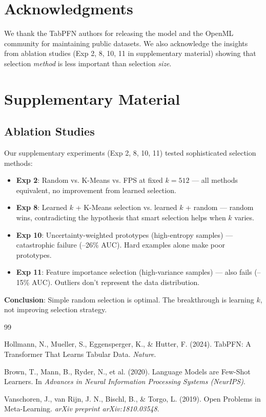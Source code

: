 \documentclass[11pt,a4paper]{article}
\begin{document}
\section*{Acknowledgments}

We thank the TabPFN authors for releasing the model and the OpenML community for maintaining public datasets. We also acknowledge the insights from ablation studies (Exp 2, 8, 10, 11 in supplementary material) showing that selection \textit{method} is less important than selection \textit{size}.

\section*{Supplementary Material}

\subsection*{Ablation Studies}

Our supplementary experiments (Exp 2, 8, 10, 11) tested sophisticated selection methods:

\begin{itemize}
\item \textbf{Exp 2}: Random vs. K-Means vs. FPS at fixed $k=512$ — all methods equivalent, no improvement from learned selection.
\item \textbf{Exp 8}: Learned $k$ + K-Means selection vs. learned $k$ + random — random wins, contradicting the hypothesis that smart selection helps when $k$ varies.
\item \textbf{Exp 10}: Uncertainty-weighted prototypes (high-entropy samples) — catastrophic failure (--26\% AUC). Hard examples alone make poor prototypes.
\item \textbf{Exp 11}: Feature importance selection (high-variance samples) — also fails (--15\% AUC). Outliers don't represent the data distribution.
\end{itemize}

\textbf{Conclusion}: Simple random selection is optimal. The breakthrough is learning $k$, not improving selection strategy.

\begin{thebibliography}{99}

Hollmann, N., Mueller, S., Eggensperger, K., \& Hutter, F. (2024).
TabPFN: A Transformer That Learns Tabular Data.
\textit{Nature}.

Brown, T., Mann, B., Ryder, N., et al. (2020).
Language Models are Few-Shot Learners.
In \textit{Advances in Neural Information Processing Systems (NeurIPS)}.

Vanschoren, J., van Rijn, J. N., Bischl, B., \& Torgo, L. (2019).
Open Problems in Meta-Learning.
\textit{arXiv preprint arXiv:1810.03548}.

\end{thebibliography}
\end{document}
